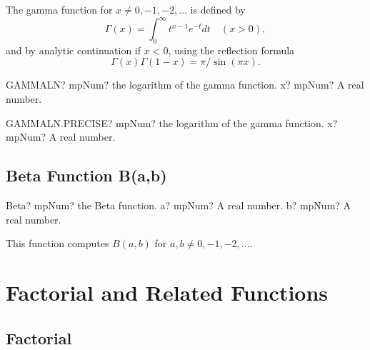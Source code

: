 \vspace{0.3cm}
The gamma function for $x \neq 0, -1, -2,\ldots$ is defined by
\begin{equation}
	\Gamma(x)  = \int_{0}^{\infty} t^{x-1} e^{-t} dt \quad (x>0),
\end{equation}
and by analytic continuation if $x<0$, using the reflection formula
\begin{equation}
	\Gamma(x) \Gamma(1-x)  = \pi / \sin(\pi x).
\end{equation}



	
	\begin{mpFunctionsExtract}
		\mpWorksheetFunctionOneNotImplemented
		{GAMMALN? mpNum? the logarithm of the gamma function.}
		{x? mpNum? A real number.}
	\end{mpFunctionsExtract}
	
	\vspace{0.6cm}
	
	\begin{mpFunctionsExtract}
		\mpWorksheetFunctionOneNotImplemented
		{GAMMALN.PRECISE? mpNum? the logarithm of the gamma function.}
		{x? mpNum? A real number.}
	\end{mpFunctionsExtract}
	
	
	
	\subsection{Beta Function B(a,b)}
	\label{BetaFunction}
	\begin{mpFunctionsExtract}
		\mpFunctionTwoNotImplemented
		{Beta? mpNum? the Beta function.}
		{a? mpNum? A real number.}
		{b? mpNum? A real number.}
	\end{mpFunctionsExtract}
	
	\vspace{0.3cm}
	This function computes $B(a,b)$ for $a, b \neq 0, -1, -2, \ldots$. 
	
	
	

\newpage
\section{Factorial and Related Functions}
\label{NumbertheoreticFunctions}
\subsection{Factorial}


